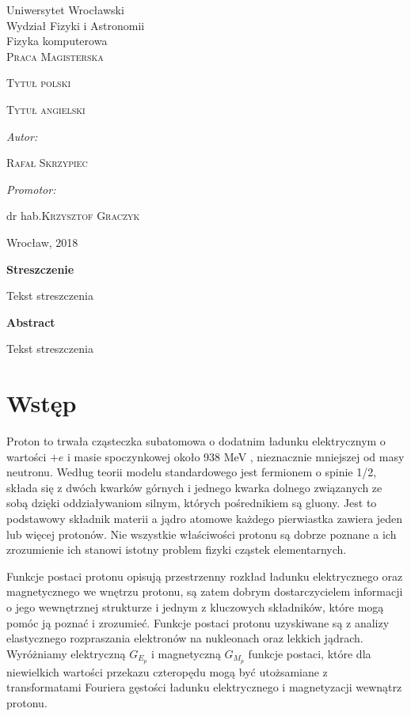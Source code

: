 \documentclass[11pt]{book}
\title{}
\author{Rafał Skrzypiec}
\makeatletter
\theoremstyle{definition}
\newcommand\blankpage{%
	\null
	\thispagestyle{empty}%
	\addtocounter{page}{0}%
	\newpage}
\renewcommand{\maketitle}{\begin{titlepage}
		
		
		
		\begin{center}
			{\Large Uniwersytet Wrocławski\\
				\vspace{0.cm}
				Wydział Fizyki i Astronomii\\
				\vspace{0.2cm}
				Fizyka komputerowa} \\
			\vspace{1.8cm}
			\LARGE \textsc{ Praca Magisterska}		
		\end{center}
		
		\vspace{3.5cm}
		
		\noindent
		
		\begin{center}		
			\huge \textsc{\@ Tytuł polski}
			
			\vspace{0.5cm}
			
			\normalsize \textsc {Tytuł angielski}
			
		\end{center}
		
		
		
		\vspace{3cm}
		
		\begin{flushright}
			
			\begin{minipage}{5.5cm}
				
				\textit{\small Autor:}
				
				\normalsize \textsc{\@ Rafał Skrzypiec} \par
				
			\end{minipage}
			
			\vspace{1cm}
			
			
			\begin{minipage}{5.5cm}
				
				\textit{\small Promotor:}
				
				\hspace{0.2cm}dr hab.\textsc{\@ Krzysztof Graczyk} \par
				
			\end{minipage}
			
		\end{flushright}
		
		
		\vspace*{\stretch{4}}
		
		\begin{center}
			
			Wrocław, 2018
			
		\end{center}
		
	\end{titlepage}%
	
}
\makeatother
\begin{document}

\maketitle
\blankpage


\begin{center}
	{\large 	\textbf{Streszczenie}}

\end{center}
\normalsize 
	Tekst streszczenia

\vspace{2cm}

\begin{center}
	{\large 	\textbf{Abstract}}
\end{center}
\normalsize
	Tekst streszczenia

\vspace{2cm}


\tableofcontents
{}
\chapter{Wstęp}

Proton to trwała cząsteczka subatomowa o dodatnim ładunku elektrycznym o wartości $+e$ i masie spoczynkowej około 938 MeV \cite{2012RvMP...84.1527M}, nieznacznie mniejszej od masy neutronu. Według teorii modelu standardowego jest fermionem o spinie 1/2, składa się z dwóch kwarków górnych i jednego kwarka dolnego związanych ze sobą dzięki oddziaływaniom silnym, których pośrednikiem są gluony. Jest to podstawowy składnik materii a jądro atomowe każdego pierwiastka zawiera jeden lub więcej protonów. Nie wszystkie właściwości protonu są dobrze poznane a ich zrozumienie ich stanowi istotny problem fizyki cząstek elementarnych.

Funkcje postaci protonu opisują przestrzenny rozkład ładunku elektrycznego oraz magnetycznego we wnętrzu protonu, są zatem dobrym dostarczycielem informacji o jego wewnętrznej strukturze i jednym z kluczowych składników, które mogą pomóc ją poznać i zrozumieć. Funkcje postaci protonu uzyskiwane są z analizy elastycznego rozpraszania elektronów na nukleonach oraz lekkich jądrach. Wyróżniamy elektryczną $G_{E_p}$ i magnetyczną $G_{M_p}$ funkcje postaci, które dla niewielkich wartości przekazu czteropędu mogą być utożsamiane z transformatami Fouriera gęstości ładunku elektrycznego i magnetyzacji wewnątrz protonu. 
\end{document}
